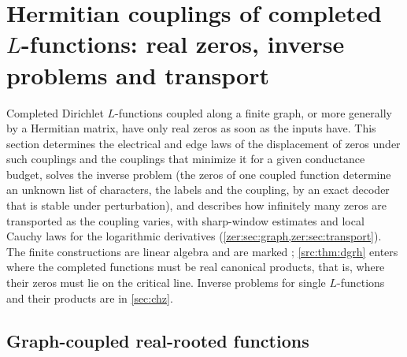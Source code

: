 \providecommand{\zerJ}{\mathcal{J}}
\providecommand{\zerK}{\mathcal{K}}
\providecommand{\zersinc}{\operatorname{sinc}}
\providecommand{\zergE}{\gamma_{\mathrm{E}}}
\providecommand{\zerLL}{\mathcal{L}}
\providecommand{\zerconv}{\operatorname{conv}}
\providecommand{\zerdiag}{\operatorname{diag}}
\providecommand{\zerSym}{\mathfrak{D}}
\providecommand{\zerLog}{\operatorname{Log}}
\section{Hermitian couplings of completed \texorpdfstring{$L$}{L}-functions: real zeros, inverse problems and transport}\label{sec:cpl}

Completed Dirichlet $L$-functions coupled along a finite graph, or more generally by a Hermitian
matrix, have only real zeros as soon as the inputs have. This section determines the electrical and
edge laws of the displacement of zeros under such couplings and the couplings that minimize it for a
given conductance budget, solves the inverse problem (the zeros of one coupled function determine an
unknown list of characters, the labels and the coupling, by an exact decoder that is stable under
perturbation), and describes how infinitely many zeros are transported as the coupling varies, with
sharp-window estimates and local Cauchy laws for the logarithmic derivatives
(\cref{zer:sec:graph,zer:sec:transport}). The finite constructions are linear algebra and are marked
\stU; \cref{src:thm:dgrh} enters where the completed functions must be real canonical products, that is,
where their zeros must lie on the critical line. Inverse problems for single $L$-functions and their
products are in \cref{sec:chz}.

\subsection{Graph-coupled real-rooted functions}\label{zer:sec:graph}

